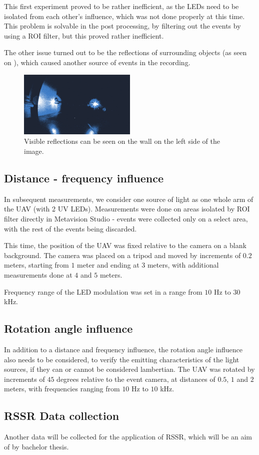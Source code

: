 This first experiment proved to be rather inefficient, as the LEDs need to be isolated from each other's influence, which
was not done properly at this time. This problem is solvable in the post processing, by filtering out the events
by using a ROI filter, but this proved rather inefficient.

The other issue turned out to be the reflections of surrounding objects (as seen on ), which caused
another source of events in the recording.

\begin{figure}[htbp]
  \centering
  \includegraphics[width=0.5\textwidth]{./fig/photos/meas1.png}
  \caption{Visible reflections can be seen on the wall on the left side of the image.}
  \label{fig:meas1}
\end{figure}

\subsection{Distance - frequency influence}

In subsequent measurements, we consider one source of light as one whole arm of the UAV (with 2 UV LEDs). Measurements were
done on areas isolated by ROI filter directly in Metavision Studio - events were collected only on a select area, with the
rest of the events being discarded.

This time, the position of the UAV was fixed relative to the camera on a blank background. The camera was placed on a tripod
and moved by increments of $0.2$ meters, starting from $1$ meter and ending at $3$ meters, with additional measurements done
at $4$ and $5$ meters.

Frequency range of the LED modulation was set in a range from $10$ Hz to $30$ kHz.

\subsection{Rotation angle influence}

In addition to a distance and frequency influence, the rotation angle influence also needs to be considered, to
verify the emitting characteristics of the light sources, if they can or cannot be considered lambertian.
The UAV was rotated by increments of $45$ degrees relative to the event camera, at distances of $0.5$, $1$ and $2$ meters,
with frequencies ranging from $10$ Hz to $10$ kHz. 

\subsection{RSSR Data collection}

Another data will be collected for the application of \ac{RSSR}, which will be an aim of by bachelor thesis.